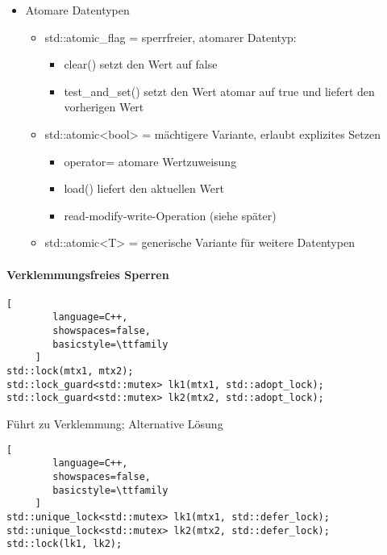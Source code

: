 \documentclass[10pt]{article}
\begin{document}
\begin{itemize}
\begin{lstlisting}[
language=C++,
showspaces=false,
basicstyle=\ttfamily
]
void add(int val) {
std::lock_guard<std::mutex> guard(my_mtx);
data.push_back(val);
}

int get() {
std::lock_guard<std::mutex> guard(my_mtx);
return data.front();
}
\end{lstlisting}
        
  \item Atomare Datentypen
        \begin{itemize}
          \item std::atomic\_flag = sperrfreier, atomarer Datentyp:
                \begin{itemize}
                  \item clear() setzt den Wert auf false
                  \item test\_and\_set() setzt den Wert atomar auf true und liefert den vorherigen Wert
                \end{itemize}
          \item std::atomic<bool> = mächtigere Variante, erlaubt explizites Setzen
                \begin{itemize}
                  \item operator= atomare Wertzuweisung
                  \item load() liefert den aktuellen Wert
                  \item read-modify-write-Operation (siehe später)
                \end{itemize}
          \item std::atomic<T> = generische Variante für weitere Datentypen
        \end{itemize}
\end{itemize}

\paragraph{Verklemmungsfreies Sperren}
\begin{lstlisting}[
        language=C++,
        showspaces=false,
        basicstyle=\ttfamily
     ]
std::lock(mtx1, mtx2);
std::lock_guard<std::mutex> lk1(mtx1, std::adopt_lock);
std::lock_guard<std::mutex> lk2(mtx2, std::adopt_lock);
\end{lstlisting}
Führt zu Verklemmung; Alternative Lösung
\begin{lstlisting}[
        language=C++,
        showspaces=false,
        basicstyle=\ttfamily
     ]
std::unique_lock<std::mutex> lk1(mtx1, std::defer_lock);
std::unique_lock<std::mutex> lk2(mtx2, std::defer_lock);
std::lock(lk1, lk2);
\end{lstlisting}
\end{document}
